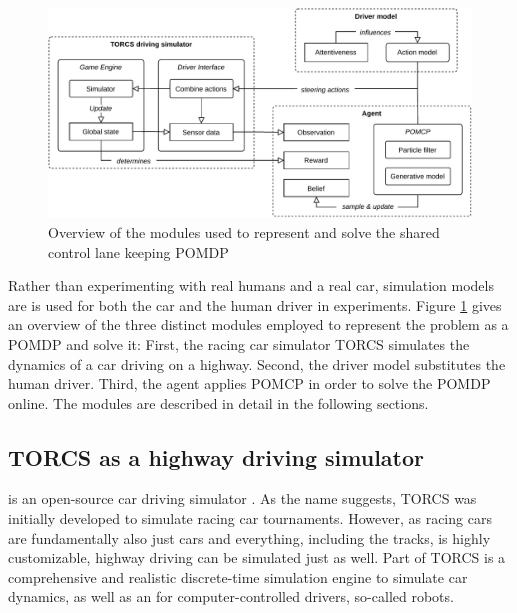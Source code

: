 \begin{figure}[htbp]
    \centerfloat
    \includegraphics[width=1.0\textwidth]{figures/Components.pdf}
    \caption{Overview of the modules used to represent and solve the shared control lane keeping POMDP}
    \label{fig:overview}
\end{figure}

Rather than experimenting with real humans and a real car, simulation models are is used for both the car and the human driver in experiments. Figure \ref{fig:overview} gives an overview of the three distinct modules employed to represent the problem as a POMDP and solve it: First, the racing car simulator TORCS \parencite{torcs} simulates the dynamics of a car driving on a highway. Second, the driver model substitutes the human driver. Third, the agent applies POMCP in order to solve the POMDP online. The modules are described in detail in the following sections. 


\subsection{TORCS as a highway driving simulator}
\label{torcs}

 is an open-source car driving simulator \parencite{torcs}. As the name suggests, TORCS was initially developed to simulate racing car tournaments. However, as racing cars are fundamentally also just cars and everything, including the tracks, is highly customizable, highway driving can be simulated just as well. Part of TORCS is a comprehensive and realistic discrete-time simulation engine to simulate car dynamics, as well as an  for computer-controlled drivers, so-called robots.

